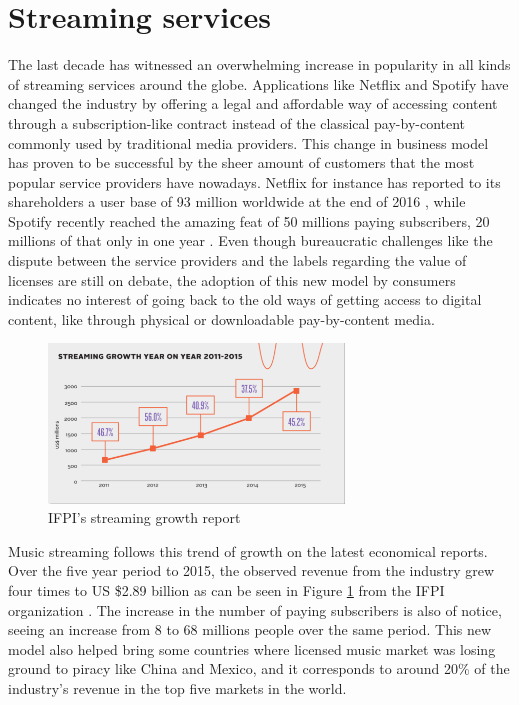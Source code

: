 \documentclass{kththesis}
\begin{document}
	
	\section{Streaming services}

	The last decade has witnessed an overwhelming increase in popularity in all kinds of streaming services around the globe. Applications like Netflix and Spotify have changed the industry by offering a legal and affordable way of accessing content through a subscription-like contract instead of the classical pay-by-content commonly used by traditional media providers. This change in business model has proven to be successful by the sheer amount of customers that the most popular service providers have nowadays. Netflix for instance has reported to its shareholders a user base of 93 million worldwide at the end of 2016 \citep{netflixsh}, while Spotify recently reached the amazing feat of 50 millions paying subscribers, 20 millions of that only in one year \citep{spotifypress}. Even though bureaucratic challenges like the dispute between the service providers and the labels regarding the value of licenses are still on debate, the adoption of this new model by consumers indicates no interest of going back to the old ways of getting access to digital content, like through physical or downloadable pay-by-content media.

	\begin{figure}[h]
    \centering
    \includegraphics[width=0.7\textwidth, natwidth=580bp, natheight=313bp]{figures/ifpi_stream_growth.png}
    \caption{IFPI's streaming growth report}
    \label{fig:ifpi-growth-report}
\end{figure}

	Music streaming follows this trend of growth on the latest economical reports. Over the five year period to 2015, the observed revenue from the industry grew four times to US \$2.89 billion as can be seen in Figure \ref{fig:ifpi-growth-report} from the IFPI organization \citep{ifpi}. The increase in the number of paying subscribers is also of notice, seeing an increase from 8 to 68 millions people over the same period. This new model also helped bring some countries where licensed music market was losing ground to piracy like China and Mexico, and it corresponds to around 20\% of the industry's revenue in the top five markets in the world. 
	
\end{document}
